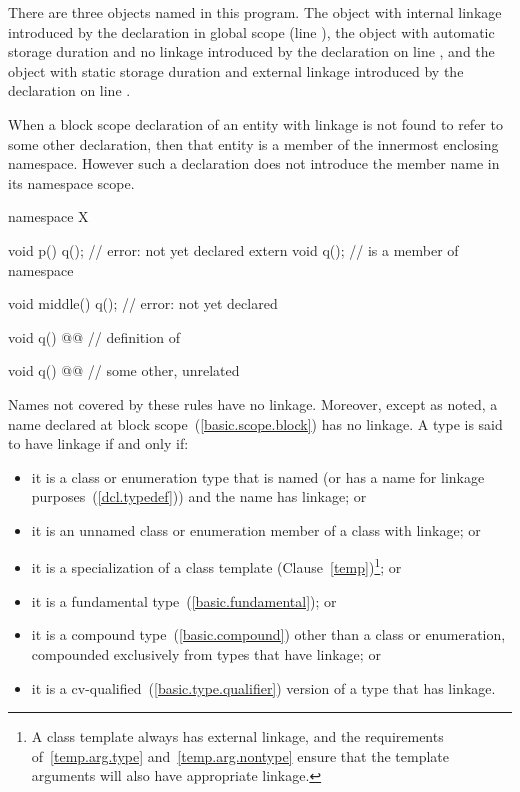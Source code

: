 There are three objects named  in this program. The object with
internal linkage introduced by the declaration in global scope (line
 ), the object with automatic storage duration and no linkage
introduced by the declaration on line , and the object with
static storage duration and external linkage introduced by the
declaration on line . \exitexample

\pnum
When a block scope declaration of an entity with linkage is not found to
refer to some other declaration, then that entity is a member of the
innermost enclosing namespace. However such a declaration does not
introduce the member name in its namespace scope. \enterexample

\begin{codeblock}
namespace X {
  void p() {
    q();                        // error:  not yet declared
    extern void q();            //  is a member of namespace 
  }

  void middle() {
    q();                        // error:  not yet declared
  }

  void q() @@       // definition of         
}

void q() @@         // some other, unrelated 
\end{codeblock}
\exitexample 

\pnum
{}%
Names not covered by these rules have no linkage. Moreover, except as
noted, a name declared at block scope~(\ref{basic.scope.block}) has no
linkage. A type is said to have linkage if and only if:

\begin{itemize}
\item it is a class or enumeration type that is named (or has a name for
linkage purposes~(\ref{dcl.typedef})) and the name has linkage; or

\item it is an unnamed class or enumeration member of a class with linkage; or

\item it is a specialization of a class template (Clause~\ref{temp})\footnote{A class
template always has external linkage, and the
requirements of~\ref{temp.arg.type} and~\ref{temp.arg.nontype} ensure
that the template arguments will also have appropriate linkage.};
or

\item it is a fundamental type~(\ref{basic.fundamental}); or

\item it is a compound type~(\ref{basic.compound}) other than a class or
enumeration, compounded exclusively from types that have linkage; or

\item it is a cv-qualified~(\ref{basic.type.qualifier}) version of a
type that has linkage.
\end{itemize}

